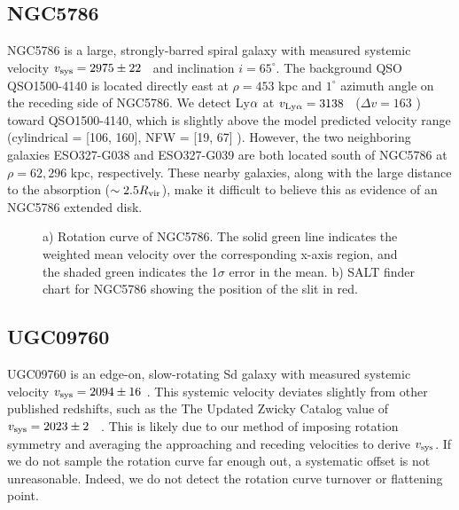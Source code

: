 \subsection{NGC5786}
NGC5786 is a large, strongly-barred spiral galaxy with measured systemic velocity $v_{\rm sys} = 2975 \pm 22$ \kms~and inclination $i = 65^{\circ}$. The background QSO QSO1500-4140 is located directly east at $\rho = 453$ kpc and $1^{\circ}$ azimuth angle on the receding side of NGC5786. We detect Ly$\rm \alpha$ at $v_{\rm Ly\alpha} = 3138$ \kms~($\Delta v = 163$ \kms) toward QSO1500-4140, which is slightly above the model predicted velocity range (cylindrical = [106, 160], NFW = [19, 67] \kms). However, the two neighboring galaxies ESO327-G038 and ESO327-G039 are both located south of NGC5786 at $\rho = 62, 296$ kpc, respectively. These nearby galaxies, along with the large distance to the absorption ($\sim 2.5 R_{\rm vir}$), make it difficult to believe this as evidence of an NGC5786 extended disk.

\begin{figure}[ht]
\centering
  \caption{\small{a) Rotation curve of NGC5786. The solid green line indicates the weighted mean velocity over the corresponding x-axis region, and the shaded green indicates the 1$\sigma$ error in the mean. b) SALT finder chart for NGC5786 showing the position of the slit in red.}}
\vspace{0pt}
\end{figure}


\subsection{UGC09760}
UGC09760 is an edge-on, slow-rotating Sd galaxy with measured systemic velocity $v_{\rm sys} =  2094 \pm 16$ \kms. This systemic velocity deviates slightly from other published redshifts, such as the The Updated Zwicky Catalog value of $v_{\rm sys} = 2023 \pm 2$ \kms~\citep{falco1999}. This is likely due to our method of imposing rotation symmetry and averaging the approaching and receding velocities to derive $v_{\rm sys}$. If we do not sample the rotation curve far enough out, a systematic offset is not unreasonable. Indeed, we do not detect the rotation curve turnover or flattening point.

